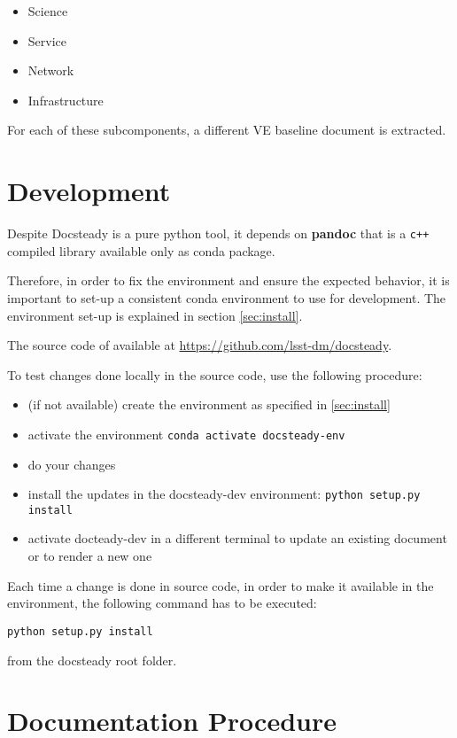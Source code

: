 \documentclass[DM]{lsstdoc}
\begin{document}
\begin{itemize}
\item Science
\item Service
\item Network
\item Infrastructure
\end{itemize}

For each of these subcomponents, a different VE baseline document is extracted.



\section{Development}
\label{sec:development}

Despite Docsteady is a pure python tool, it depends on \textbf{pandoc} that is a \texttt{c++} compiled library available only as conda package.

Therefore, in order to fix the environment and ensure the expected behavior, it is important to set-up a consistent conda environment to use for development.
The environment set-up is explained in section \ref{sec:install}.

The source code of available at \url{https://github.com/lsst-dm/docsteady}.

To test changes done locally in the source code, use the following procedure:

\begin{itemize}
\item (if not available) create the environment as specified in \ref{sec:install}
\item activate the environment \texttt{conda activate docsteady-env}
\item do your changes
\item install the updates in the docsteady-dev environment: \texttt{python setup.py install}
\item activate docteady-dev in a different terminal to update an existing document or to render a new one
\end{itemize}

Each time a change is done in source code, in order to make it available in the environment, the following command has to be executed:

\texttt{python setup.py install}

from the docsteady root folder.


\section{Documentation Procedure}
\label{sec:docproc}
\end{document}
